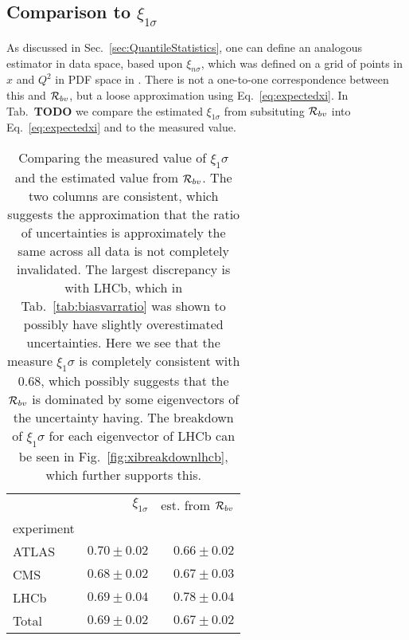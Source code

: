 \subsection{Comparison to $\xi_{1\sigma}$}

As discussed in Sec.~\ref{sec:QuantileStatistics}, one can define an analogous
estimator in data space, based upon $\xi_{n\sigma}$, which was defined on a grid
of points in $x$ and $Q^2$ in PDF space in \cite{nnpdf30}. There is not
a one-to-one correspondence
between this and $\mathcal{R}_{bv}$, but a loose approximation using
Eq.~\ref{eq:expectedxi}. In Tab.~{\bf TODO} we compare the estimated
$\xi_{1\sigma}$ from
subsituting $\mathcal{R}_{bv}$ into Eq.~\ref{eq:expectedxi} and to the
measured value.

\begin{table}
    \begin{center}
        \begin{tabular}{lrr}
            \toprule
            {} &  $\xi_{1\sigma}$ &  est. from $\mathcal{R}_{bv}$ \\
            experiment &  &                \\
            \midrule
            ATLAS       &  $0.70 \pm 0.02$ &  $0.66 \pm 0.02$ \\
            CMS         &  $0.68 \pm 0.02$ &  $0.67 \pm 0.03$ \\
            LHCb        &  $0.69 \pm 0.04$ &  $0.78 \pm 0.04$ \\
            Total       &  $0.69 \pm 0.02$ &  $0.67 \pm 0.02$ \\
            \bottomrule
        \end{tabular}
    \end{center}
    \caption{
        Comparing the measured value of $\xi_1\sigma$ and the estimated
        value from $\mathcal{R}_{bv}$. The two columns are consistent, which
        suggests the approximation that the ratio of uncertainties is
        approximately the same across all data is not completely invalidated.
        The largest discrepancy is with LHCb, which in Tab.~\ref{tab:biasvarratio}
        was shown to possibly have slightly overestimated uncertainties. Here we
        see that the measure $\xi_1\sigma$ is completely consistent with 0.68,
        which possibly suggests that the $\mathcal{R}_{bv}$ is dominated by some
        eigenvectors of the uncertainty having. The breakdown of $\xi_1\sigma$
        for each eigenvector of LHCb can be seen in
        Fig.~\ref{fig:xibreakdownlhcb}, which further supports this.
    }
    \label{tab:xicomparison}
\end{table}

